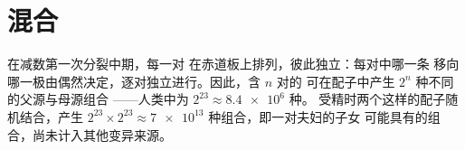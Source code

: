 \section{混合}

\begin{proposition}[自由组合]\label{prop:g12:meiosis-genetic-shuffling:assortment}
在减数第一次分裂中期，每一对
在赤道板上排列，彼此独立：每对中哪一条
移向哪一极由偶然决定，逐对独立进行。因此，含 $n$ 对的
可在配子中产生 $2^n$ 种不同的父源与母源组合
——人类中为 $2^{23} \approx \num{8.4e6}$ 种。
受精时两个这样的配子随机结合，产生 $2^{23}
\times 2^{23} \approx \num{7e13}$ 种组合，即一对夫妇的子女
可能具有的组合，尚未计入其他变异来源。
\end{proposition}
\admitted


